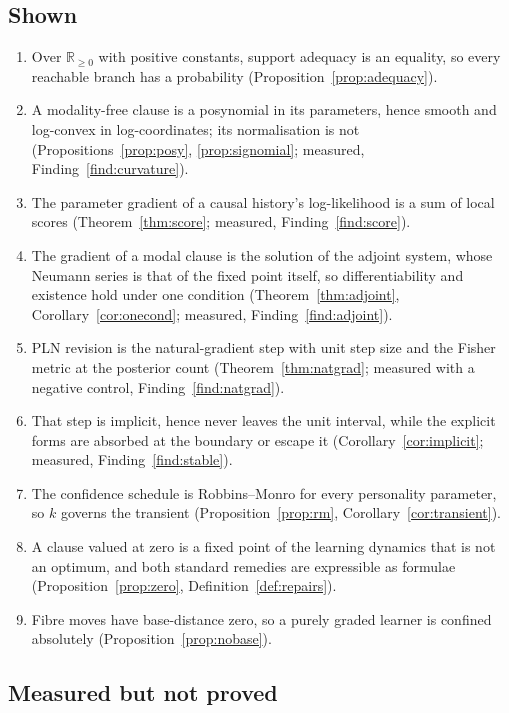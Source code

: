 \documentclass[11pt,a4paper]{article}
\theoremstyle{plain}
\theoremstyle{definition}
\theoremstyle{remark}
\newcommand{\Rnn}{\mathbb{R}_{\geq 0}}
\begin{document}
\subsection{Shown}

\begin{enumerate}[leftmargin=1.6em,itemsep=1pt]
\item Over $\Rnn$ with positive constants, support adequacy is an equality, so
every reachable branch has a probability (Proposition~\ref{prop:adequacy}).
\item A modality-free clause is a posynomial in its parameters, hence smooth and
log-convex in log-coordinates; its normalisation is not
(Propositions~\ref{prop:posy}, \ref{prop:signomial}; measured,
Finding~\ref{find:curvature}).
\item The parameter gradient of a causal history's log-likelihood is a sum of
local scores (Theorem~\ref{thm:score}; measured, Finding~\ref{find:score}).
\item The gradient of a modal clause is the solution of the adjoint system, whose
Neumann series is that of the fixed point itself, so differentiability and
existence hold under one condition (Theorem~\ref{thm:adjoint},
Corollary~\ref{cor:onecond}; measured, Finding~\ref{find:adjoint}).
\item PLN revision is the natural-gradient step with unit step size and the Fisher
metric at the posterior count (Theorem~\ref{thm:natgrad}; measured with a negative
control, Finding~\ref{find:natgrad}).
\item That step is implicit, hence never leaves the unit interval, while the
explicit forms are absorbed at the boundary or escape it
(Corollary~\ref{cor:implicit}; measured, Finding~\ref{find:stable}).
\item The confidence schedule is Robbins--Monro for every personality parameter,
so $k$ governs the transient (Proposition~\ref{prop:rm},
Corollary~\ref{cor:transient}).
\item A clause valued at zero is a fixed point of the learning dynamics that is
not an optimum, and both standard remedies are expressible as formulae
(Proposition~\ref{prop:zero}, Definition~\ref{def:repairs}).
\item Fibre moves have base-distance zero, so a purely graded learner is confined
absolutely (Proposition~\ref{prop:nobase}).
\end{enumerate}

\subsection{Measured but not proved}
\end{document}
